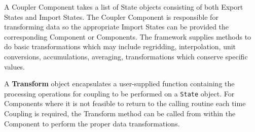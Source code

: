 A Coupler Component takes a list of State objects consisting of
both Export States and Import States.
The Coupler Component is responsible for transforming data 
so the appropriate Import States can be provided the corresponding
Component or Components.
The framework supplies
methods to do basic transformations which may include regridding,
interpolation, unit conversions, accumulations, averaging,
transformations which conserve specific values.


A {\bf Transform} object encapsulates a user-supplied function
containing the processing operations for coupling to be 
performed on a {\tt State} object.  For Components where it is not
feasible to return to the calling routine each time Coupling is
required, the Transform method can be called from within the
Component to perform the proper data transformations.

